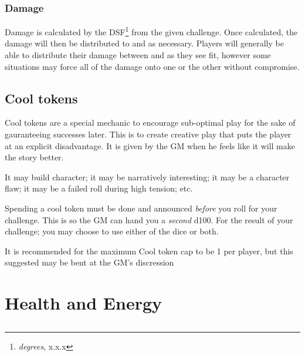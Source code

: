 \subsection{Damage}

Damage is calculated by the DSF\footnote{\emph{degrees}, x.x.x} from
the given challenge. Once calculated, the damage will then be distributed
to \HPful  and \ENful  as necessary. Players will generally be able
to distribute their damage between \HPful  and \ENful  as they see
fit, however some situations may force all of the damage onto one
or the other without compromise. 

\section{Cool tokens}

Cool tokens are a special mechanic to encourage sub-optimal play for
the sake of gauranteeing successes later. This is to create creative
play that puts the player at an explicit disadvantage. It is given
by the GM when he feels like it will make the story better.

It may build character; it may be narratively interesting; it may
be a character flaw; it may be a failed roll during high tension;
etc.

Spending a cool token must be done and announced \emph{before} you
roll for your challenge. This is so the GM can hand you a \emph{second}
d100. For the result of your challenge; you may choose to use either
of the dice or both.

It is recommended for the maximum Cool token cap to be 1 per player,
but this suggested may be bent at the GM's discression


\chapter{Health and Energy}

\section{\HPful{}}

